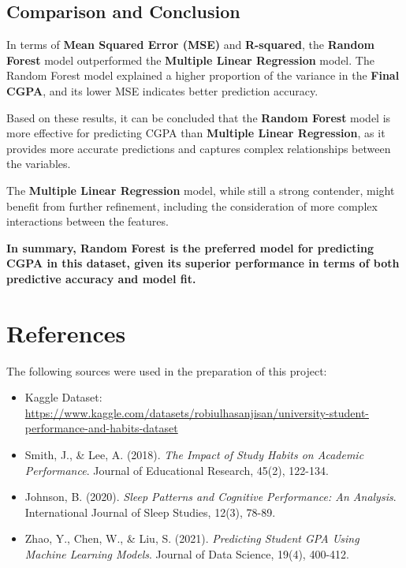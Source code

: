 \documentclass{article}
\begin{document}
\subsection{Comparison and Conclusion}
In terms of \textbf{Mean Squared Error (MSE)} and \textbf{R-squared}, the \textbf{Random Forest} model outperformed the \textbf{Multiple Linear Regression} model. The Random Forest model explained a higher proportion of the variance in the \textbf{Final CGPA}, and its lower MSE indicates better prediction accuracy.

Based on these results, it can be concluded that the \textbf{Random Forest} model is more effective for predicting CGPA than \textbf{Multiple Linear Regression}, as it provides more accurate predictions and captures complex relationships between the variables.

The \textbf{Multiple Linear Regression} model, while still a strong contender, might benefit from further refinement, including the consideration of more complex interactions between the features.

\textbf{In summary, Random Forest is the preferred model for predicting CGPA in this dataset, given its superior performance in terms of both predictive accuracy and model fit.}

\section{References}

The following sources were used in the preparation of this project:

\begin{itemize}
    \item Kaggle Dataset: \url{https://www.kaggle.com/datasets/robiulhasanjisan/university-student-performance-and-habits-dataset}
    \item Smith, J., \& Lee, A. (2018). \textit{The Impact of Study Habits on Academic Performance}. Journal of Educational Research, 45(2), 122-134.
    \item Johnson, B. (2020). \textit{Sleep Patterns and Cognitive Performance: An Analysis}. International Journal of Sleep Studies, 12(3), 78-89.
    \item Zhao, Y., Chen, W., \& Liu, S. (2021). \textit{Predicting Student GPA Using Machine Learning Models}. Journal of Data Science, 19(4), 400-412.
\end{itemize}
\end{document}
